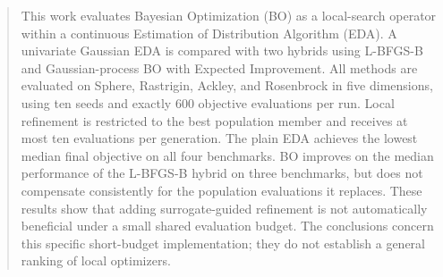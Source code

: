 \begin{abstract}
This work evaluates Bayesian Optimization (BO) as a local-search operator within a continuous Estimation of Distribution Algorithm (EDA). A univariate Gaussian EDA is compared with two hybrids using L-BFGS-B and Gaussian-process BO with Expected Improvement. All methods are evaluated on Sphere, Rastrigin, Ackley, and Rosenbrock in five dimensions, using ten seeds and exactly 600 objective evaluations per run. Local refinement is restricted to the best population member and receives at most ten evaluations per generation. The plain EDA achieves the lowest median final objective on all four benchmarks. BO improves on the median performance of the L-BFGS-B hybrid on three benchmarks, but does not compensate consistently for the population evaluations it replaces. These results show that adding surrogate-guided refinement is not automatically beneficial under a small shared evaluation budget. The conclusions concern this specific short-budget implementation; they do not establish a general ranking of local optimizers.
\end{abstract}
